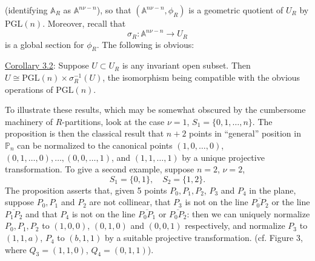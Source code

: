 
(identifying $\mathbb{A}_R$ as $\mathbb{A}^{n\nu-n}$), so that $(\mathbb{A}^{n\nu-n},\phi_R)$ is a geometric quotient of $U_R$ by $\mathrm{PGL}(n)$. Moreover, recall that
\[
\sigma_R:\mathbb{A}^{n\nu-n}\longrightarrow U_R
\]
is a global section for $\phi_R$. The following is obvious:

\uline{Corollary 3.2}: Suppose $U\subset U_R$ is any invariant open subset. Then $U\cong\mathrm{PGL}(n)\times\sigma_R^{-1}(U)$, the isomorphism being compatible with the obvious operations of $\mathrm{PGL}(n)$.

To illustrate these results, which may be somewhat obscured by the cumbersome machinery of $R$-partitions, look at the case $\nu=1$, $S_1=\{0,1,\ldots,n\}$. The proposition is then the classical result that $n+2$ points in ``general'' position in $\mathbb{P}_n$ can be normalized to the canonical points $(1,0,\ldots,0)$, $(0,1,\ldots,0),\ldots,(0,0,\ldots,1)$, and $(1,1,\ldots,1)$ by a unique projective transformation. To give a second example, suppose $n=2$, $\nu=2$,
\[
S_1=\{0,1\},\quad S_2=\{1,2\}.
\]
The proposition asserts that, given 5 points $P_0,P_1,P_2$, $P_3$ and $P_4$ in the plane, suppose $P_0,P_1$ and $P_2$ are not collinear, that $P_3$ is not on the line $\overline{P_0P_2}$ or the line $\overline{P_1P_2}$ and that $P_4$ is not on the line $\overline{P_0P_1}$ or $\overline{P_0P_2}$: then we can uniquely normalize $P_0,P_1,P_2$ to $(1,0,0)$, $(0,1,0)$ and $(0,0,1)$ respectively, and normalize $P_3$ to $(1,1,a)$, $P_4$ to $(b,1,1)$ by a suitable projective transformation. (cf. Figure 3, where $Q_3=(1,1,0)$, $Q_4=(0,1,1)$).

